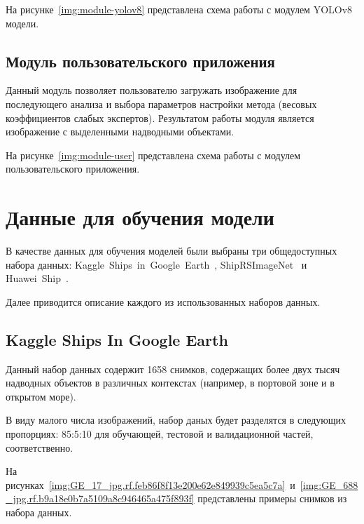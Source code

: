 На рисунке~\ref{img:module-yolov8} представлена схема работы с модулем YOLOv8 модели.



\subsection*{Модуль пользовательского приложения}

Данный модуль позволяет пользователю загружать изображение для последующего анализа и выбора параметров настройки метода (весовых коэффициентов слабых экспертов). Результатом работы модуля является изображение с выделенными надводными объектами.

На рисунке~\ref{img:module-user} представлена схема работы с модулем пользовательского приложения.


\section{Данные для обучения модели}

В качестве данных для обучения моделей были выбраны три общедоступных набора данных: Kaggle~Ships~in~Google~Earth~\cite{kaggle-ships-in-google-earth-dfqwt_dataset}, ShipRSImageNet~\cite{shiprs-imagenet} и Huawei~Ship~\cite{huawei_ship_dataset}.

Далее приводится описание каждого из использованных наборов данных.

\subsection*{Kaggle Ships In Google Earth}

Данный набор данных содержит 1658 снимков, содержащих более двух тысяч надводных объектов в различных контекстах (например, в портовой зоне и в открытом море).

В виду малого числа изображений, набор даных будет разделятся в следующих пропорциях: 85:5:10 для обучающей, тестовой и валидационной частей, соответственно.

На рисунках~\ref{img:GE_17_jpg.rf.feb86f8f13e200e62e849939c5ea5c7a}~и~\ref{img:GE_688_jpg.rf.b9a18e0b7a5109a8c946465a475f893f} представлены примеры снимков из набора данных.


